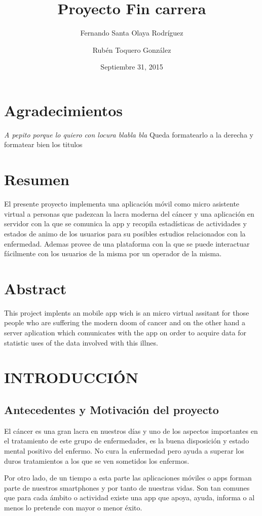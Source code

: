 \documentclass[b5paper,10pt,twoside]{book}
\title{Proyecto Fin carrera}
\author{Fernando Santa Olaya Rodríguez \\
	\and 
	Rubén Toquero González}
\date{Septiembre 31, 2015}
\begin{document}
	\maketitle
	\chapter*{Agradecimientos}
	\textit{A pepito porque lo quiero con locura blabla bla} Queda formatearlo a la derecha y  formatear bien los titulos
	\chapter*{Resumen}
	 	El presente proyecto implementa una aplicación móvil como micro asistente virtual a personas que padezcan la lacra moderna del cáncer y una aplicación en servidor con la que se comunica la app y recopila estadísticas de actividades y estados de animo de los usuarios para su posibles estudios relacionados con la enfermedad. Ademas provee de una plataforma con la que se puede interactuar fácilmente con los usuarios de la misma por un operador de la misma. 
	 
	\chapter*{Abstract}
	 	This project implents an mobile app wich is an micro virtual assitant for those people who are suffering the modern doom of cancer and on the other hand a server aplication which comunicates with the app on order to acquire data for statistic uses of the data involved with this illnes. 
	
	\tableofcontents
	
	\chapter{INTRODUCCIÓN}
	
	\section{Antecedentes y Motivación del proyecto}
	El cáncer es una gran lacra en nuestros días \cite{OMS} y uno de los aspectos importantes en el tratamiento de este grupo de enfermedades, es la buena disposición y estado mental positivo del enfermo. No cura la enfermedad pero ayuda a superar los duros tratamientos a los que se ven sometidos los enfermos.
	
	Por otro lado, de un tiempo a esta parte las aplicaciones móviles o apps forman parte de nuestros smartphones y por tanto de nuestras vidas. Son tan comunes que para cada ámbito o actividad existe una app que apoya, ayuda, informa o al menos lo pretende con mayor o menor éxito.
	
\end{document}

